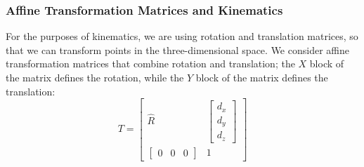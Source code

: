 \subsubsection*{Affine Transformation Matrices and Kinematics}
For the purposes of kinematics, we are using rotation and translation matrices, so that we can transform points in the three-dimensional space. We consider affine transformation matrices that combine rotation and translation; the $X$ block of the matrix defines the rotation, while the $Y$ block of the matrix defines the translation: 
\[
T = 
\begin{bmatrix}
\widehat{R} &  \begin{bmatrix} d_x\\d_y\\d_z \end{bmatrix}\\
\begin{bmatrix}
0 & 0 & 0
\end{bmatrix} & 1
\end{bmatrix}
\] 
%
%
%
%
